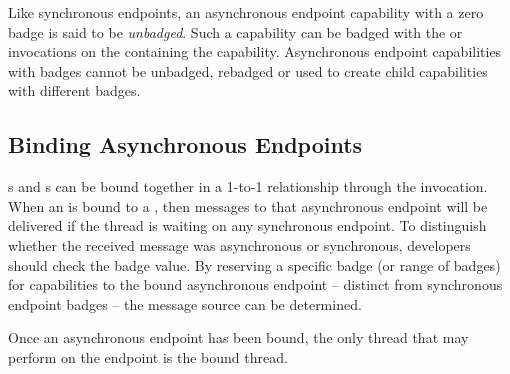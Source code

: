 Like synchronous endpoints, an asynchronous endpoint capability with
a zero badge is said to be \emph{unbadged}. Such a capability can be
badged with the  or  invocations on the
 containing the capability. Asynchronous endpoint
capabilities with badges cannot be unbadged, rebadged or used to create
child capabilities with different badges.

\subsection{Binding Asynchronous Endpoints}
\label{sec:asyncep-binding}

s and s can be bound together in a 1-to-1 relationship
through the  invocation. When an
 is bound to a , then messages to that asynchronous
endpoint will be delivered if the thread is waiting on any synchronous
endpoint. To distinguish whether the received message was asynchronous
or synchronous, developers should check the badge value. By reserving a
specific badge (or range of badges) for capabilities to the bound
asynchronous endpoint -- distinct from synchronous endpoint badges -- the
message source can be determined.

Once an asynchronous endpoint has been bound, the only thread that may perform
 on the endpoint is the bound thread.
